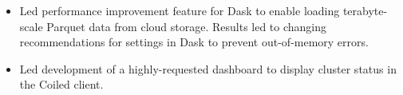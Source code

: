\begin{itemize}
\item Led performance improvement feature for Dask to enable loading terabyte-scale Parquet data from cloud storage. Results led to changing recommendations for settings in Dask to prevent out-of-memory errors.
\item Led development of a highly-requested dashboard to display cluster status in the Coiled client.
\end{itemize}
\sectionsep

\\
\\

